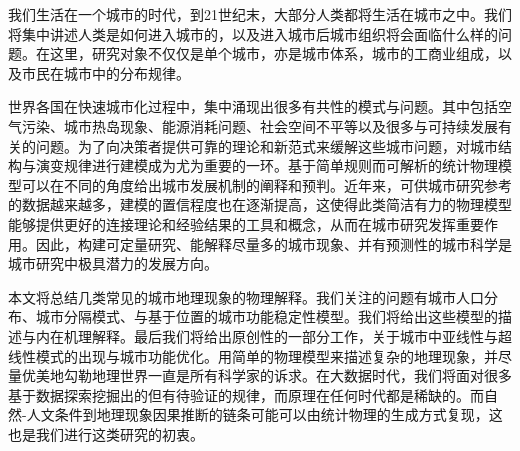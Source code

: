 我们生活在一个城市的时代，到21世纪末，大部分人类都将生活在城市之中。我们将集中讲述人类是如何进入城市的，以及进入城市后城市组织将会面临什么样的问题。在这里，研究对象不仅仅是单个城市，亦是城市体系，城市的工商业组成，以及市民在城市中的分布规律。
	
世界各国在快速城市化过程中，集中涌现出很多有共性的模式与问题。其中包括空气污染、城市热岛现象、能源消耗问题、社会空间不平等以及很多与可持续发展有关的问题。为了向决策者提供可靠的理论和新范式来缓解这些城市问题，对城市结构与演变规律进行建模成为尤为重要的一环。基于简单规则而可解析的统计物理模型可以在不同的角度给出城市发展机制的阐释和预判。近年来，可供城市研究参考的数据越来越多，建模的置信程度也在逐渐提高，这使得此类简洁有力的物理模型能够提供更好的连接理论和经验结果的工具和概念，从而在城市研究发挥重要作用。因此，构建可定量研究、能解释尽量多的城市现象、并有预测性的城市科学是城市研究中极具潜力的发展方向。
	
本文将总结几类常见的城市地理现象的物理解释。我们关注的问题有城市人口分布、城市分隔模式、与基于位置的城市功能稳定性模型。我们将给出这些模型的描述与内在机理解释。最后我们将给出原创性的一部分工作，关于城市中亚线性与超线性模式的出现与城市功能优化。用简单的物理模型来描述复杂的地理现象，并尽量优美地勾勒地理世界一直是所有科学家的诉求。在大数据时代，我们将面对很多基于数据探索挖掘出的但有待验证的规律，而原理在任何时代都是稀缺的。而自然-人文条件到地理现象因果推断的链条可能可以由统计物理的生成方式复现，这也是我们进行这类研究的初衷。